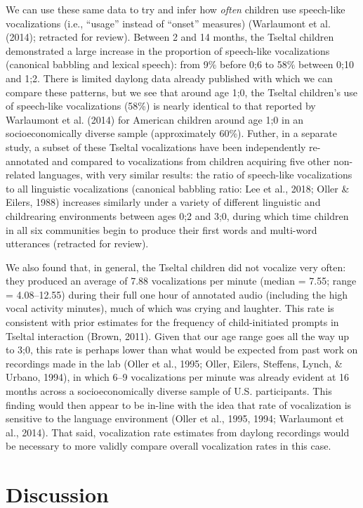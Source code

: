 \documentclass[floatsintext,man]{apa6}
\theoremstyle{definition}
\theoremstyle{definition}
\theoremstyle{definition}
\theoremstyle{remark}
\begin{document}
We can use these same data to try and infer how \emph{often} children
use speech-like vocalizations (i.e., \enquote{usage} instead of
\enquote{onset} measures) (Warlaumont et al. (2014); retracted for
review). Between 2 and 14 months, the Tseltal children demonstrated a
large increase in the proportion of speech-like vocalizations (canonical
babbling and lexical speech): from 9\% before 0;6 to 58\% between 0;10
and 1;2. There is limited daylong data already published with which we
can compare these patterns, but we see that around age 1;0, the Tseltal
children's use of speech-like vocalizations (58\%) is nearly identical
to that reported by Warlaumont et al. (2014) for American children
around age 1;0 in an socioeconomically diverse sample (approximately
60\%). Futher, in a separate study, a subset of these Tseltal
vocalizations have been independently re-annotated and compared to
vocalizations from children acquiring five other non-related languages,
with very similar results: the ratio of speech-like vocalizations to all
linguistic vocalizations (canonical babbling ratio: Lee et al., 2018;
Oller \& Eilers, 1988) increases similarly under a variety of different
linguistic and childrearing environments between ages 0;2 and 3;0,
during which time children in all six communities begin to produce their
first words and multi-word utterances (retracted for review).

We also found that, in general, the Tseltal children did not vocalize
very often: they produced an average of 7.88 vocalizations per minute
(median = 7.55; range = 4.08--12.55) during their full one hour of
annotated audio (including the high vocal activity minutes), much of
which was crying and laughter. This rate is consistent with prior
estimates for the frequency of child-initiated prompts in Tseltal
interaction (Brown, 2011). Given that our age range goes all the way up
to 3;0, this rate is perhaps lower than what would be expected from past
work on recordings made in the lab (Oller et al., 1995; Oller, Eilers,
Steffens, Lynch, \& Urbano, 1994), in which 6--9 vocalizations per
minute was already evident at 16 months across a socioeconomically
diverse sample of U.S. participants. This finding would then appear to
be in-line with the idea that rate of vocalization is sensitive to the
language environment (Oller et al., 1995, 1994; Warlaumont et al.,
2014). That said, vocalization rate estimates from daylong recordings
would be necessary to more validly compare overall vocalization rates in
this case.

\section{Discussion}\label{disc}
\end{document}
